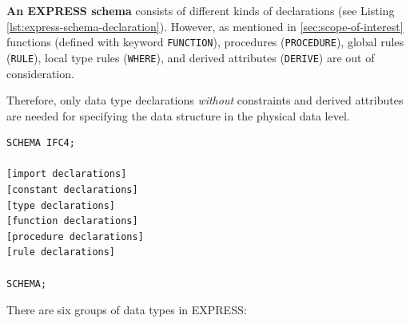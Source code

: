 \textbf{An EXPRESS schema} consists of different kinds of declarations (see Listing \ref{lst:express-schema-declaration}).
However, as mentioned in \autoref{sec:scope-of-interest} functions (defined with keyword \texttt{FUNCTION}), procedures (\texttt{PROCEDURE}), global rules (\texttt{RULE}), local type rules (\texttt{WHERE}), and derived attributes (\texttt{DERIVE}) are out of consideration.



Therefore, only data type declarations \emph{without} constraints and derived attributes are needed for specifying the data structure in the physical data level.






\begin{lstlisting}[caption={The structure of an EXPRESS schema},label=lst:express-schema-declaration]
SCHEMA IFC4;

[import declarations]
[constant declarations]
[type declarations]
[function declarations]
[procedure declarations]
[rule declarations]

SCHEMA;
\end{lstlisting}




There are six groups of data types in EXPRESS:

